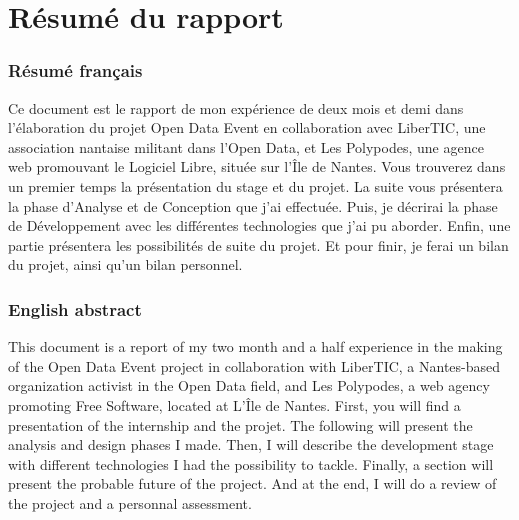 \part*{Résumé du rapport}

\section*{Résumé français}

Ce document est le rapport de mon expérience de deux mois et demi dans l'élaboration du projet Open Data Event en collaboration avec LiberTIC, une association nantaise militant dans l'Open Data, et Les Polypodes, une agence web promouvant le Logiciel Libre, située sur l'Île de Nantes. Vous trouverez dans un premier temps la présentation du stage et du projet. La suite vous présentera la phase d'Analyse et de Conception que j'ai effectuée. Puis, je décrirai la phase de Développement avec les différentes technologies que j'ai pu aborder. Enfin, une partie présentera les possibilités de suite du projet. Et pour finir, je ferai un bilan du projet, ainsi qu'un bilan personnel.

\section*{English abstract}

This document is a report of my two month and a half experience in the making of the Open Data Event project in collaboration with LiberTIC, a Nantes-based organization activist in the Open Data field, and Les Polypodes, a web agency promoting Free Software, located at L'Île de Nantes. First, you will find a presentation of the internship and the projet. The following will present the analysis and design phases I made. Then, I will describe the development stage with different technologies I had the possibility to tackle. Finally, a section will present the probable future of the project. And at the end, I will do a review of the project and a personnal assessment.
